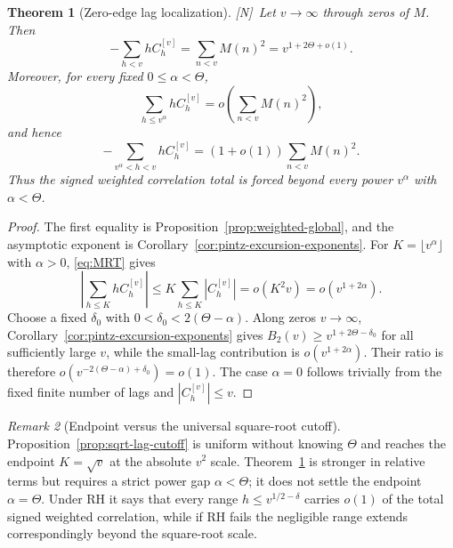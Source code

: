 \documentclass[11pt]{amsart}
\numberwithin{equation}{section}
\theoremstyle{plain}
\newtheorem{theorem}{Theorem}[section]
\theoremstyle{definition}
\theoremstyle{remark}
\newtheorem{remark}[theorem]{Remark}
\newcommand{\tagN}{\textup{[N]}}
\begin{document}
\begin{theorem}[Zero-edge lag localization]
\label{thm:theta-lag-localization}
\tagN\ Let $v\to\infty$ through zeros of $M$.  Then
\begin{equation}
\label{eq:weighted-corr-exponent}
 -\sum_{h<v}hC_h^{[v]}
 =\sum_{n<v}M(n)^2
 =v^{1+2\Theta+o(1)}.
\end{equation}
Moreover, for every fixed $0\le\alpha<\Theta$,
\begin{equation}
\label{eq:theta-small-lags-negligible}
 \sum_{h\le v^\alpha}hC_h^{[v]}
 =o\!\left(\sum_{n<v}M(n)^2\right),
\end{equation}
and hence
\begin{equation}
\label{eq:theta-large-lag-mass}
 -\sum_{v^\alpha<h<v}hC_h^{[v]}
 =(1+o(1))\sum_{n<v}M(n)^2.
\end{equation}
Thus the signed weighted correlation total is forced beyond every power
$v^\alpha$ with $\alpha<\Theta$.
\end{theorem}

\begin{proof}
The first equality is Proposition~\ref{prop:weighted-global}, and the
asymptotic exponent is Corollary~\ref{cor:pintz-excursion-exponents}.
For $K=\lfloor v^\alpha\rfloor$ with $\alpha>0$, \eqref{eq:MRT} gives
\[
 \left|\sum_{h\le K}hC_h^{[v]}\right|
 \le K\sum_{h\le K}|C_h^{[v]}|
 =o(K^2v)=o(v^{1+2\alpha}).
\]
Choose a fixed $\delta_0$ with
$0<\delta_0<2(\Theta-\alpha)$.  Along zeros $v\to\infty$,
Corollary~\ref{cor:pintz-excursion-exponents} gives
$B_2(v)\ge v^{1+2\Theta-\delta_0}$ for all sufficiently large $v$, while
the small-lag contribution is $o(v^{1+2\alpha})$.  Their ratio is therefore
$o(v^{-2(\Theta-\alpha)+\delta_0})=o(1)$.  The case
$\alpha=0$ follows trivially from the fixed finite number of lags and
$|C_h^{[v]}|\le v$.
\end{proof}

\begin{remark}[Endpoint versus the universal square-root cutoff]
\label{rem:theta-vs-sqrt-cutoff}
Proposition~\ref{prop:sqrt-lag-cutoff} is uniform without knowing $\Theta$
and reaches the endpoint $K=\sqrt v$ at the absolute $v^2$ scale.
Theorem~\ref{thm:theta-lag-localization} is stronger in relative terms but
requires a strict power gap $\alpha<\Theta$; it does not settle the endpoint
$\alpha=\Theta$.  Under RH it says that every range
$h\le v^{1/2-\delta}$ carries $o(1)$ of the total signed weighted correlation, while if RH
fails the negligible range extends correspondingly beyond the square-root
scale.
\end{remark}
\end{document}
